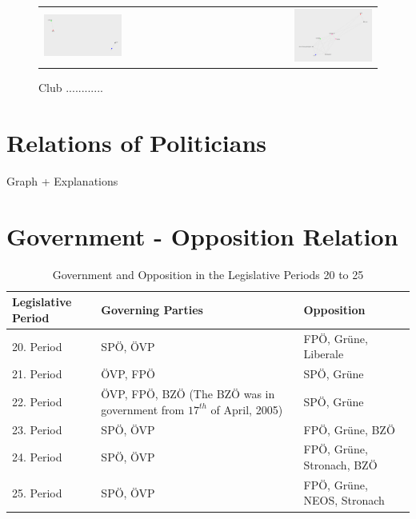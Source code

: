 \begin{figure}
\begin{tabular}{ l r }
	\includegraphics[width=0.49\textwidth]{imgs/graphs/club-graphs/clubs_21} & \includegraphics[width=0.49\textwidth]{imgs/graphs/club-graphs/clubs_25}
\end{tabular}
	\caption{Club ............}
	\label{fig:club_graphs1}
\end{figure}


\section{Relations of Politicians}
Graph + Explanations

\section{Government - Opposition Relation}
\label{sec:gov_opp_relation}

\begin{table}[h]

\centering
\bgroup
\def\arraystretch{1.2}
\begin{tabular}{| p{2cm} | p{5cm} | l |}
\hline
  Legislative Period & Governing Parties & Opposition  \\
\hline
\hline
  20. Period & SPÖ, ÖVP & FPÖ, Grüne, Liberale \\
\hline
  21. Period & ÖVP, FPÖ & SPÖ, Grüne \\
\hline
  22. Period & ÖVP, FPÖ, BZÖ (The BZÖ was in government from $17^{th}$ of April, 2005) & SPÖ, Grüne \\
\hline
  23. Period & SPÖ, ÖVP & FPÖ, Grüne, BZÖ \\
\hline
  24. Period & SPÖ, ÖVP & FPÖ, Grüne, Stronach, BZÖ \\
\hline
  25. Period & SPÖ, ÖVP & FPÖ, Grüne, NEOS, Stronach \\
\hline

\end{tabular}
\egroup
\caption{Government and Opposition in the Legislative Periods 20 to 25}
\label{table:gov_opp_parties}
\end{table}




